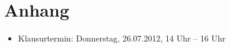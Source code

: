 \chapter*{Anhang}
\begin{itemize}
 \item Klausurtermin: Donnerstag, 26.07.2012, 14 Uhr – 16 Uhr
\end{itemize}
